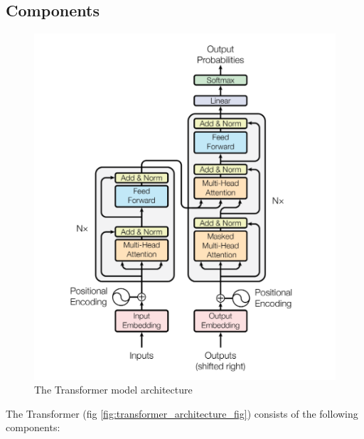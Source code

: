 \subsection{Components}

\begin{figure}[h!]
	\includegraphics[width=\linewidth]{"pictures/the-transformer-model-architecture.png"} %
	\caption{The Transformer model architecture} %
	\label{fig:transformer_architecture_fig}
\end{figure}

The Transformer (fig \autoref{fig:transformer_architecture_fig}) consists of the following components:

